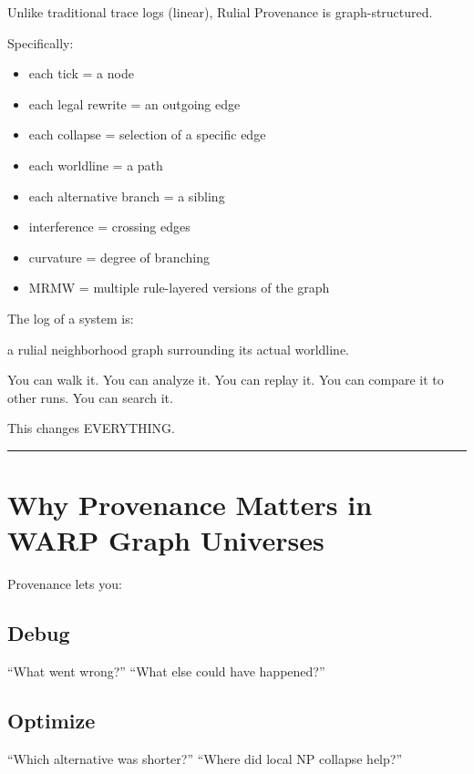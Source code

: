 Unlike traditional trace logs (linear), Rulial Provenance is
graph-structured.

Specifically:

\begin{itemize}
\tightlist
\item
  each tick = a node
\item
  each legal rewrite = an outgoing edge
\item
  each collapse = selection of a specific edge
\item
  each worldline = a path
\item
  each alternative branch = a sibling
\item
  interference = crossing edges
\item
  curvature = degree of branching
\item
  MRMW = multiple rule-layered versions of the graph
\end{itemize}

The log of a system is:

a rulial neighborhood graph surrounding its actual worldline.

You can walk it. You can analyze it. You can replay it. You can compare
it to other runs. You can search it.

This changes EVERYTHING.

\begin{center}\rule{0.5\linewidth}{0.5pt}\end{center}

\section{Why Provenance Matters in WARP Graph
Universes}\label{why-provenance-matters-in-rmg-universes}

Provenance lets you:

\subsection{Debug}\label{debug}

``What went wrong?'' ``What else could have happened?''

\subsection{Optimize}\label{optimize}

``Which alternative was shorter?'' ``Where did local NP collapse help?''

